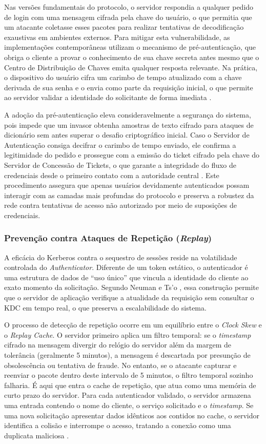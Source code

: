Nas versões fundamentais do protocolo, o servidor respondia a qualquer pedido de login com uma mensagem cifrada pela chave do usuário, o que permitia que um atacante coletasse esses pacotes para realizar tentativas de decodificação exaustivas em ambientes externos. Para mitigar esta vulnerabilidade, as implementações contemporâneas utilizam o mecanismo de pré-autenticação, que obriga o cliente a provar o conhecimento de sua chave secreta antes mesmo que o Centro de Distribuição de Chaves emita qualquer resposta relevante. Na prática, o dispositivo do usuário cifra um carimbo de tempo atualizado com a chave derivada de sua senha e o envia como parte da requisição inicial, o que permite ao servidor validar a identidade do solicitante de forma imediata \cite{tanenbaum2017}.

A adoção da pré-autenticação eleva consideravelmente a segurança do sistema, pois impede que um invasor obtenha amostras de texto cifrado para ataques de dicionário sem antes superar o desafio criptográfico inicial. Caso o Servidor de Autenticação consiga decifrar o carimbo de tempo enviado, ele confirma a legitimidade do pedido e prossegue com a emissão do ticket cifrado pela chave do Servidor de Concessão de Tickets, o que garante a integridade do fluxo de credenciais desde o primeiro contato com a autoridade central \cite{coulouris2013}. Este procedimento assegura que apenas usuários devidamente autenticados possam interagir com as camadas mais profundas do protocolo e preserva a robustez da rede contra tentativas de acesso não autorizado por meio de suposições de credenciais.

\subsubsection{Prevenção contra Ataques de Repetição (\textit{Replay})}
A eficácia do Kerberos contra o sequestro de sessões reside na volatilidade controlada do \textit{Authenticator}. Diferente de um token estático, o autenticador é uma estrutura de dados de ``uso único'' que vincula a identidade do cliente ao exato momento da solicitação. Segundo Neuman e Ts'o \cite{neuman1994}, essa construção permite que o servidor de aplicação verifique a atualidade da requisição sem consultar o KDC em tempo real, o que preserva a escalabilidade do sistema.

O processo de detecção de repetição ocorre em um equilíbrio entre o \textit{Clock Skew} e o \textit{Replay Cache}. O servidor primeiro aplica um filtro temporal: se o \textit{timestamp} cifrado na mensagem divergir do relógio do servidor além da margem de tolerância (geralmente 5 minutos), a mensagem é descartada por presunção de obsolescência ou tentativa de fraude. No entanto, se o atacante capturar e reenviar o pacote dentro deste intervalo de 5 minutos, o filtro temporal sozinho falharia. É aqui que entra o cache de repetição, que atua como uma memória de curto prazo do servidor. Para cada autenticador validado, o servidor armazena uma entrada contendo o nome do cliente, o serviço solicitado e o \textit{timestamp}. Se uma nova solicitação apresentar dados idênticos aos contidos no cache, o servidor identifica a colisão e interrompe o acesso, tratando a conexão como uma duplicata maliciosa \cite{tanenbaum2017}.

